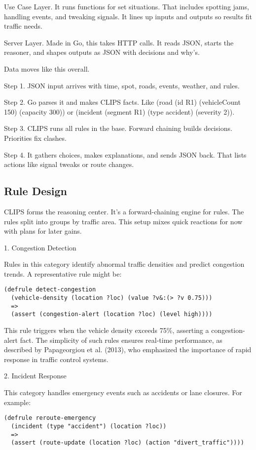 \documentclass{article}
\begin{document}
Use Case Layer. It runs functions for set situations. That includes spotting jams, handling events, and tweaking signals. It lines up inputs and outputs so results fit traffic needs.

Server Layer. Made in Go, this takes HTTP calls. It reads JSON, starts the reasoner, and shapes outputs as JSON with decisions and why's.

Data moves like this overall.

Step 1. JSON input arrives with time, spot, roads, events, weather, and rules.

Step 2. Go parses it and makes CLIPS facts. Like (road (id R1) (vehicleCount 150) (capacity 300)) or (incident (segment R1) (type accident) (severity 2)).

Step 3. CLIPS runs all rules in the base. Forward chaining builds decisions. Priorities fix clashes.

Step 4. It gathers choices, makes explanations, and sends JSON back. That lists actions like signal tweaks or route changes.

\subsection{Rule Design}

CLIPS forms the reasoning center. It's a forward-chaining engine for rules. The rules split into groups by traffic area. This setup mixes quick reactions for now with plans for later gains.

1. Congestion Detection

Rules in this category identify abnormal traffic densities and predict congestion trends. A representative rule might be:
\begin{verbatim}
(defrule detect-congestion
  (vehicle-density (location ?loc) (value ?v&:(> ?v 0.75)))
  =>
  (assert (congestion-alert (location ?loc) (level high))))
\end{verbatim}

This rule triggers when the vehicle density exceeds 75\%, asserting a congestion-alert fact. The simplicity of such rules ensures real-time performance, as described by Papageorgiou et al. (2013), who emphasized the importance of rapid response in traffic control systems.

2. Incident Response

This category handles emergency events such as accidents or lane closures. For example:

\begin{verbatim}
(defrule reroute-emergency
  (incident (type "accident") (location ?loc))
  =>
  (assert (route-update (location ?loc) (action "divert_traffic"))))
\end{verbatim}
\end{document}
